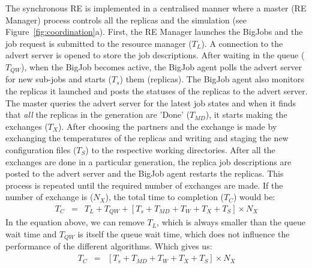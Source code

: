 \documentclass{rspublic}
\begin{document}
The synchronous RE is implemented in a centralised manner where a master (RE Manager) process controls all the replicas and the simulation (see Figure~\ref{fig:coordination}a). First, the RE Manager launches the BigJobs and the job request is submitted to the resource manager ($T_{L}$). A connection to the advert server is opened to store the job descriptions. %
After waiting in the queue ($T_{QW}$), when the BigJob becomes active, 
the BigJob agent polls the advert server for new sub-jobs 
and starts ($T_{s}$) them (replicas). The BigJob agent also monitors the 
replicas it launched and posts the statuses of the replicas to the advert 
server. The master queries the advert server for the latest job 
states and when it finds that \emph{all} the replicas in the generation are 'Done' ($T_{MD}$), it 
starts making the exchanges ($T_{X}$). After choosing the partners and the exchange is made by exchanging the temperatures of the replicas and writing and staging the new configuration files ($T_{S}$)
to the respective working directories. After all the exchanges 
are done in a particular generation, the replica job descriptions 
are posted to the advert server and the BigJob agent restarts the 
replicas. This process is repeated until the required number of 
exchanges are made. If the number of exchange is ($N_{X}$), the total time to completion ($T_{C}$) would be:
\begin{eqnarray}
T_{C} &=& T_{L}+T_{QW}+[T_{s}+T_{MD} + T_{W} + T_{X}+T_{S}] \times N_{X}
\label{eq:synch}
\end{eqnarray}
In the equation above, we can remove $T_{L}$, which is always smaller than the queue wait time and $T_{QW}$ is itself the queue wait time, which does not influence the performance of the different algorithms. Which gives us:
\begin{eqnarray}
T_{C} &=& [T_{s}+T_{MD} + T_{W} + T_{X}+T_{S}] \times N_{X}
\label{eq:synch}
\end{eqnarray}

\end{document}
